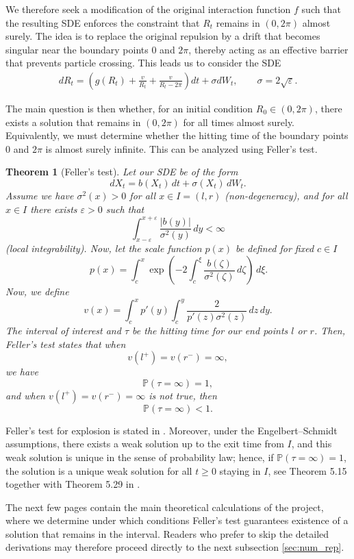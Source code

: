 \documentclass[11pt]{article}
\newcommand{\1}{\mathbbm{1}}
\theoremstyle{plain}
\newtheorem{theorem}{Theorem}[section]
\theoremstyle{definition}
\theoremstyle{remark}
\begin{document}
We therefore seek a modification of the original interaction function $f$ such that the resulting SDE enforces the constraint that $R_t$ remains in $(0,2\pi)$ almost surely. The idea is to replace the original repulsion by a drift that becomes singular near the boundary points $0$ and $2\pi$, thereby acting as an effective barrier that prevents particle crossing. This leads us to consider the SDE
\begin{align}
dR_t
=
\left(g(R_t)+\frac{v}{R_t}+\frac{v}{R_t-2\pi}\right)dt
+
\sigma dW_t,
\qquad
\sigma = 2\sqrt{\varepsilon}.
\label{eq:barrier_updated_rep_SDE}
\end{align}

The main question is then whether, for an initial condition $R_0\in(0,2\pi)$, there exists a solution that remains in $(0,2\pi)$ for all times almost surely. Equivalently, we must determine whether the hitting time of the boundary points $0$ and $2\pi$ is almost surely infinite. This can be analyzed using Feller's test.

\begin{theorem}[Feller's test]
Let our SDE be of the form
\[
dX_t = b(X_t)\,dt + \sigma(X_t)\,dW_t.
\]
Assume we have $\sigma^2(x) > 0$ for all $x \in I = (l,r)$ (non-degeneracy), and for all $x \in I$ there exists $\varepsilon > 0$ such that
\[
\int_{x-\varepsilon}^{x+\varepsilon} \frac{|b(y)|}{\sigma^2(y)}\,dy < \infty
\]
(local integrability). Now, let the scale function $p(x)$ be defined for fixed $ c \in I$
\[
 \, p(x) = \int_c^x \exp\!\left(
-2\int_c^\xi \frac{b(\zeta)}{\sigma^2(\zeta)}\,d\zeta
\right)\,d\xi.
\]
Now, we define
\[
v(x) = \int_c^x p'(y)\int_c^y \frac{2}{p'(z)\sigma^2(z)}\,dz\,dy.
\]
The interval of interest and $\tau$ be the hitting time for our end points $l$ or $r$. Then, Feller's test states that when
\[
v(l^+) = v(r^-) = \infty,
\]
we have
\[
\mathbb{P}(\tau = \infty) = 1,
\]
and when $v(l^+) = v(r^-) = \infty$ is not true, then
\[
\mathbb{P}(\tau = \infty) < 1.
\]
\label{thm:fellers_test}
\end{theorem}
Feller's test for explosion is stated in \cite{lee2024finite}. Moreover, under the Engelbert--Schmidt assumptions, there exists a weak solution up to the exit time from $I$, and this weak solution is unique in the sense of probability law; hence, if $\mathbb{P}(\tau=\infty)=1$, the solution is a unique weak solution for all $t\ge 0$ staying in $I$, see Theorem 5.15 together with Theorem 5.29 in \cite{karatzasshreve1991brownian}. 

The next few pages contain the main theoretical calculations of the project, where we determine under which conditions Feller's test guarantees existence of a solution that remains in the interval. Readers who prefer to skip the detailed derivations may therefore proceed directly to the next subsection \ref{sec:num_rep}.
\end{document}
